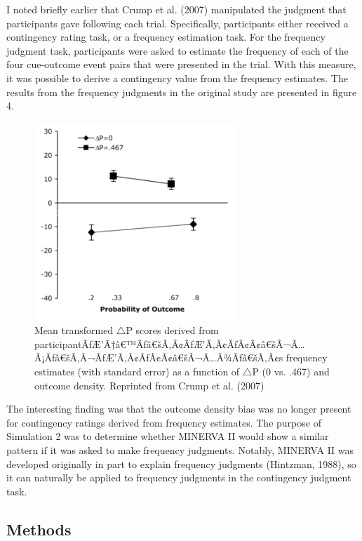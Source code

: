 \documentclass[
  english,
  man,floatsintext]{apa6}
\begin{document}
I noted briefly earlier that Crump et al. (2007) manipulated the judgment that participants gave following each trial. Specifically, participants either received a contingency rating task, or a frequency estimation task. For the frequency judgment task, participants were asked to estimate the frequency of each of the four cue-outcome event pairs that were presented in the trial. With this measure, it was possible to derive a contingency value from the frequency estimates. The results from the frequency judgments in the original study are presented in figure 4.

\begin{figure}

{\centering \includegraphics[width=3in]{imgs/crump_frequency_results} 

}

\caption{Mean transformed $\triangle$P scores derived from participantÃƒÆ’Ã†â€™Ãƒâ€šÃ‚Â¢ÃƒÆ’Ã‚Â¢ÃƒÂ¢Ã¢â€šÂ¬Ã…Â¡Ãƒâ€šÃ‚Â¬ÃƒÆ’Ã‚Â¢ÃƒÂ¢Ã¢â€šÂ¬Ã…Â¾Ãƒâ€šÃ‚Â¢s frequency estimates (with standard error) as a function of $\triangle$P (0 vs. .467) and outcome density. Reprinted from Crump et al. (2007)}\label{fig:unnamed-chunk-6}
\end{figure}

The interesting finding was that the outcome density bias was no longer present for contingency ratings derived from frequency estimates. The purpose of Simulation 2 was to determine whether MINERVA II would show a similar pattern if it was asked to make frequency judgments. Notably, MINERVA II was developed originally in part to explain frequency judgments (Hintzman, 1988), so it can naturally be applied to frequency judgments in the contingency judgment task.

\hypertarget{methods-1}{%
\subsection{Methods}\label{methods-1}}
\end{document}
